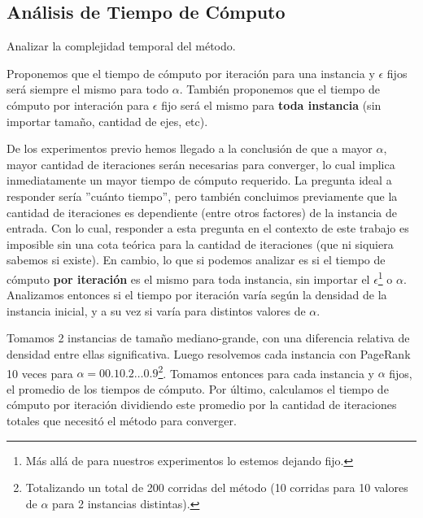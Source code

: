 \subsection{An\'alisis de Tiempo de C\'omputo}
\label{subsec:exp4}
\begin{LaTeXdescription}
    \item[Objetivo] Analizar la complejidad temporal del m\'etodo.

    \item[Hip\'otesis] Proponemos que el tiempo de c\'omputo por iteraci\'on
        para una instancia y $\epsilon$ fijos ser\'a siempre el mismo para todo
        $\alpha$. Tambi\'en proponemos que el tiempo de c\'omputo por interación
        para $\epsilon$ fijo ser\'a el mismo para \textbf{toda instancia} (sin
        importar tama\~no, cantidad de ejes, etc).

    \item[Proposici\'on] De los experimentos previo hemos llegado a la
        conclusi\'on de que a mayor $\alpha$, mayor cantidad de iteraciones
        ser\'an necesarias para converger, lo cual implica inmediatamente un mayor tiempo
        de c\'omputo requerido. La pregunta ideal a responder ser\'ia ''cu\'anto
        tiempo'', pero
        tambi\'en concluimos previamente que la cantidad de iteraciones es
        dependiente (entre otros factores) de la instancia de entrada. Con lo
        cual, responder a esta pregunta en el contexto de este trabajo es
        imposible sin una cota te\'orica para la cantidad de
        iteraciones (que ni siquiera sabemos si existe). En cambio, lo que si podemos analizar es
        si el tiempo de c\'omputo \textbf{por iteraci\'on} es el mismo para toda
        instancia, sin importar el $\epsilon$\footnote{M\'as all\'a de para nuestros
        experimentos lo estemos dejando fijo.} o $\alpha$. Analizamos entonces
        si el tiempo por iteraci\'on var\'ia seg\'un
        la densidad de la instancia inicial, y a su vez si varía para distintos
        valores de $\alpha$.

    \item[M\'etodo de Experimentaci\'on] Tomamos 2 instancias de tama\~no
        mediano-grande, con una diferencia relativa de densidad entre ellas
        significativa. Luego resolvemos cada instancia con PageRank 10 veces
        para $\alpha = 0 0.1 0.2 \dots 0.9$\footnote{Totalizando un total de 200
        corridas del m\'etodo (10 corridas para 10 valores de $\alpha$ para 2
        instancias distintas).}.  Tomamos entonces para cada instancia y
        $\alpha$ fijos, el promedio de los tiempos de c\'omputo. Por \'ultimo,
        calculamos el tiempo de c\'omputo por iteraci\'on dividiendo este
        promedio por la cantidad de iteraciones totales que necesit\'o el
        m\'etodo para converger.

    \item[Resultados, an\'alisis y discusi\'on]
\end{LaTeXdescription}

